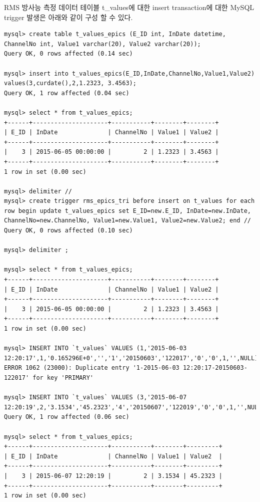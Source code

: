 \documentclass[11pt
  , a4paper
  , article
  , oneside
]{memoir}
\begin{document}
RMS 방사능 측정 데이터 테이블 t\_values에 대한 insert transaction에 대한 MySQL trigger 발생은 아래와 같이 구성 할 수 있다.


\begin{lstlisting}[style=termstyle]
mysql> create table t_values_epics (E_ID int, InDate datetime, ChannelNo int, Value1 varchar(20), Value2 varchar(20));
Query OK, 0 rows affected (0.14 sec)

mysql> insert into t_values_epics(E_ID,InDate,ChannelNo,Value1,Value2) values(3,curdate(),2,1.2323, 3.4563);
Query OK, 1 row affected (0.04 sec)

mysql> select * from t_values_epics;
+------+---------------------+-----------+--------+--------+
| E_ID | InDate              | ChannelNo | Value1 | Value2 |
+------+---------------------+-----------+--------+--------+
|    3 | 2015-06-05 00:00:00 |         2 | 1.2323 | 3.4563 |
+------+---------------------+-----------+--------+--------+
1 row in set (0.00 sec)

mysql> delimiter //
mysql> create trigger rms_epics_tri before insert on t_values for each row begin update t_values_epics set E_ID=new.E_ID, InDate=new.InDate, ChannelNo=new.ChannelNo, Value1=new.Value1, Value2=new.Value2; end //
Query OK, 0 rows affected (0.10 sec)

mysql> delimiter ;

mysql> select * from t_values_epics;
+------+---------------------+-----------+--------+--------+
| E_ID | InDate              | ChannelNo | Value1 | Value2 |
+------+---------------------+-----------+--------+--------+
|    3 | 2015-06-05 00:00:00 |         2 | 1.2323 | 3.4563 |
+------+---------------------+-----------+--------+--------+
1 row in set (0.00 sec)

mysql> INSERT INTO `t_values` VALUES (1,'2015-06-03 12:20:17',1,'0.165296E+0','','1','20150603','122017','0','0',1,'',NULL);
ERROR 1062 (23000): Duplicate entry '1-2015-06-03 12:20:17-20150603-122017' for key 'PRIMARY'

mysql> INSERT INTO `t_values` VALUES (3,'2015-06-07 12:20:19',2,'3.1534','45.2323','4','20150607','122019','0','0',1,'',NULL);
Query OK, 1 row affected (0.06 sec)

mysql> select * from t_values_epics;
+------+---------------------+-----------+--------+---------+
| E_ID | InDate              | ChannelNo | Value1 | Value2  |
+------+---------------------+-----------+--------+---------+
|    3 | 2015-06-07 12:20:19 |         2 | 3.1534 | 45.2323 |
+------+---------------------+-----------+--------+---------+
1 row in set (0.00 sec)


\end{lstlisting}
\end{document}
